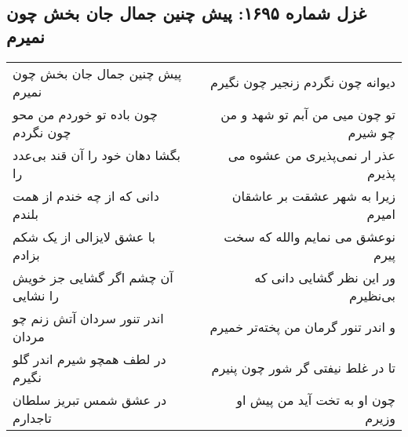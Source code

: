 \begin{center}
\section*{غزل شماره ۱۶۹۵: پیش چنین جمال جان بخش چون نمیرم}
\label{sec:1695}
\begin{longtable}{l p{0.5cm} r}
پیش چنین جمال جان بخش چون نمیرم
&&
دیوانه چون نگردم زنجیر چون نگیرم
\\
چون باده تو خوردم من محو چون نگردم
&&
تو چون میی من آبم تو شهد و من چو شیرم
\\
بگشا دهان خود را آن قند بی‌عدد را
&&
عذر ار نمی‌پذیری من عشوه می پذیرم
\\
دانی که از چه خندم از همت بلندم
&&
زیرا به شهر عشقت بر عاشقان امیرم
\\
با عشق لایزالی از یک شکم بزادم
&&
نوعشق می نمایم والله که سخت پیرم
\\
آن چشم اگر گشایی جز خویش را نشایی
&&
ور این نظر گشایی دانی که بی‌نظیرم
\\
اندر تنور سردان آتش زنم چو مردان
&&
و اندر تنور گرمان من پخته‌تر خمیرم
\\
در لطف همچو شیرم اندر گلو نگیرم
&&
تا در غلط نیفتی گر شور چون پنیرم
\\
در عشق شمس تبریز سلطان تاجدارم
&&
چون او به تخت آید من پیش او وزیرم
\\
\end{longtable}
\end{center}
